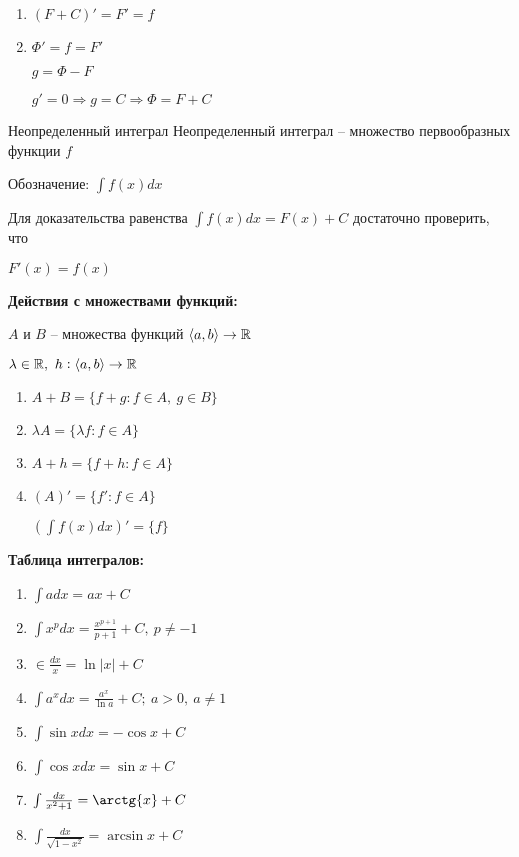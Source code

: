 \documentclass[12pt]{article}
\newcommand{\q}[1]{\langle #1 \rangle}
\begin{document}
\begin{enumerate}
    \item $(F + C)' = F' = f$
    \item $\Phi' = f = F'$
    
    $g = \Phi - F$

    $g' = 0 \Rightarrow g = C \Rightarrow \Phi = F + C$
\end{enumerate}

\begin{defin}{Неопределенный интеграл}
    Неопределенный интеграл -- множество первообразных функции $f$

    Обозначение: $\int f(x)dx$
\end{defin}

\begin{Remark}{}
    Для доказательства равенства $\int f(x)dx = F(x) + C$ достаточно проверить, что 
    
    $F'(x) = f(x)$
\end{Remark}

\textbf{Действия с множествами функций:}

$A$ и $B$ -- множества функций $\q{a, b} \rightarrow \R$

$\lambda \in \R,\ h : \q{a, b} \rightarrow \R$

\begin{enumerate}
    \item $A + B = \{f + g : f \in A,\ g \in B\}$
    \item $\lambda A = \{\lambda f : f \in A\}$
    \item $A + h = \{f + h : f \in A\}$
    \item $(A)' = \{f' : f \in A\}$
    
    \begin{Example}{}
        $(\int f(x)dx)' = \{ f \}$
    \end{Example}
\end{enumerate}

\textbf{Таблица интегралов:}

\begin{enumerate}
    \item $\int adx = ax + C$
    \item $\int x^pdx = \frac{x^{p + 1}}{p + 1} + C,\ p \neq -1$
    \item $\in \frac{dx}{x} = \ln{|x|} + C$
    \item $\int a^xdx = \frac{a^x}{\ln{a}} + C;\ a > 0,\ a \neq 1$
    \item $\int \sin{x}dx = -\cos{x} + C$
    \item $\int \cos{x}dx = \sin{x} + C$
    \item $\int \frac{dx}{x^2 + 1} = \arctg{x} + C$
    \item $\int \frac{dx}{\sqrt{1 - x^2}} = \arcsin{x} + C$
\end{enumerate}
\end{document}
